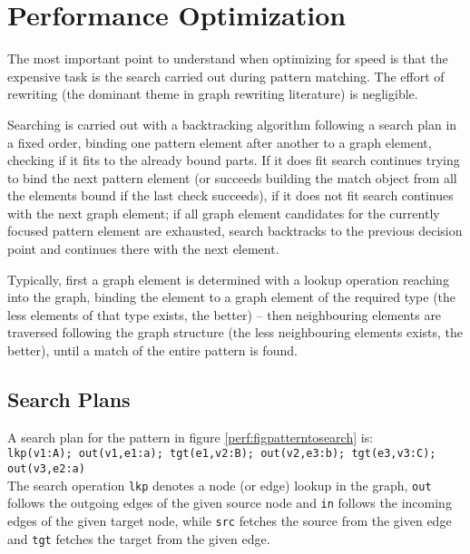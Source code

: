 \chapter{Performance Optimization}\label{cha:performance} 

The most important point to understand when optimizing for speed is that the expensive task is the search carried out during pattern matching. The effort of rewriting (the dominant theme in graph rewriting literature) is negligible.

Searching is carried out with a backtracking algorithm following a search plan in a fixed order, 
binding one pattern element after another to a graph element, checking if it fits to the already bound parts.
If it does fit search continues trying to bind the next pattern element (or succeeds building the match object from all the elements bound if the last check succeeds), if it does not fit search continues with the next graph element; if all graph element candidates for the currently focused pattern element are exhausted, search backtracks to the previous decision point and continues there with the next element.

Typically, first a graph element is determined with a lookup operation reaching into the graph, binding the element to a graph element of the required type (the less elements of that type exists, the better) -- then neighbouring elements are traversed following the graph structure (the less neighbouring elements exists, the better), until a match of the entire pattern is found.


\section{Search Plans}

A search plan for the pattern in figure \ref{perf:figpatterntosearch} is:\\
\texttt{lkp(v1:A); out(v1,e1:a); tgt(e1,v2:B); out(v2,e3:b); tgt(e3,v3:C); out(v3,e2:a)}\\
The search operation \texttt{lkp} denotes a node (or edge) lookup in the graph, \texttt{out} follows the outgoing edges of the given source node and \texttt{in} follows the incoming edges of the given target node, while \texttt{src} fetches the source from the given edge and \texttt{tgt} fetches the target from the given edge.


